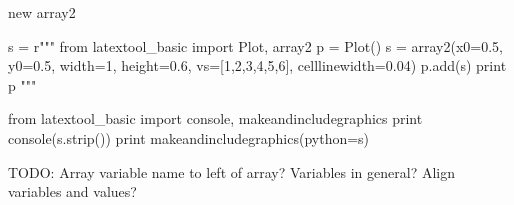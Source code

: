 new array2
\begin{python}
s = r"""
from latextool_basic import Plot, array2
p = Plot()
s = array2(x0=0.5, y0=0.5, width=1, height=0.6, 
           vs=[1,2,3,4,5,6],
           celllinewidth=0.04)
p.add(s)
print p
"""

from latextool_basic import console, makeandincludegraphics
print console(s.strip())
print makeandincludegraphics(python=s)
\end{python}



TODO: Array variable name to left of array?
Variables in general?
Align variables and values?
